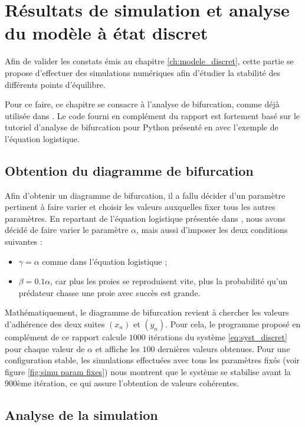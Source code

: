 \chapter{Résultats de simulation et analyse du modèle à état discret}
\label{ch:simu}

Afin de valider les constats émis au chapitre \ref{ch:modele_discret}, cette partie se propose d'effectuer des simulations numériques afin d'étudier la stabilité des différents points d'équilibre.

Pour ce faire, ce chapitre se consacre à l'analyse de bifurcation, comme déjà utilisée dans \cite{ChaosControl}. Le code fourni en complément du rapport est fortement basé sur le tutoriel d'analyse de bifurcation pour Python présenté en \cite{bifurc} avec l'exemple de l'équation logistique.

\section{Obtention du diagramme de bifurcation}

Afin d'obtenir un diagramme de bifurcation, il a fallu décider d'un paramètre pertinent à faire varier et choisir les valeurs auxquelles fixer tous les autres paramètres. En repartant de l'équation logistique présentée dans \cite{bifurc}, nous avons décidé de faire varier le paramètre $\alpha$, mais aussi d'imposer les deux conditions suivantes :
\begin{itemize}
	\item $\gamma = \alpha$ comme dans l'équation logistique ;
	\item $\beta = 0.1 \alpha$, car plus les proies se reproduisent vite, plus la probabilité qu'un prédateur chasse une proie avec succès est grande.
\end{itemize}

Mathématiquement, le diagramme de bifurcation revient à chercher les valeurs d'adhérence des deux suites $(x_n)$ et $(y_n)$. Pour cela, le programme proposé en complément de ce rapport calcule $1000$ itérations du système \ref{eq:syst_discret} pour chaque valeur de $\alpha$ et affiche les $100$ dernières valeurs obtenues. Pour une configuration stable, les simulations effectuées avec tous les paramètres fixés (voir figure \ref{fig:simu param fixes}) nous montrent que le système se stabilise avant la $900$ème itération, ce qui assure l'obtention de valeurs cohérentes.

\section{Analyse de la simulation}

